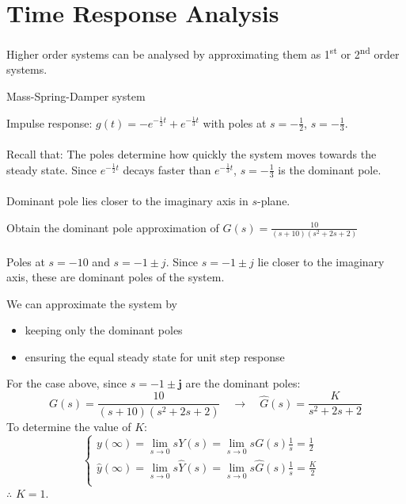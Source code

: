 \newpage
\section{Time Response Analysis}
Higher order systems can be analysed by approximating them as 1\textsuperscript{st} or 2\textsuperscript{nd} order systems. 
\begin{ex}{Mass-Spring-Damper system}
\begin{figure}[H] 
    \centering
    
\end{figure}
Impulse response: $g(t) = -e^{-\frac{1}{2}t}+ e^{-\frac{1}{3}t}$ with poles at $s=-\frac{1}{2}$, $s=-\frac{1}{3}$.\\\\
Recall that: The poles determine how quickly the system moves towards the steady state. Since $e^{-\frac{1}{2}t}$ decays faster than $e^{-\frac{1}{3}t}$, $s=-\frac{1}{3}$ is the dominant pole.\\\\
{\color{red}Dominant pole} lies closer to the imaginary axis in $s$-plane.
\begin{figure}[H] 
    \centering 
    
\end{figure}
\end{ex}
\begin{ex}{}
    Obtain the dominant pole approximation of $\displaystyle G(s) = \frac{10}{(s+10)(s^{2}+2s+2)}$\\\\
    Poles at $s=-10$ and $s = -1\pm j$. Since $s = -1\pm j$ lie closer to the imaginary axis, these are dominant poles of the system.
    \begin{figure}[H] 
        \centering 
        
    \end{figure}
    We can approximate the system by 
    \begin{itemize}
    \item keeping only the dominant poles
    \item ensuring the equal steady state for unit step response
    \end{itemize}
    For the case above, since $s = -1\pm \mathbf{j}$ are the dominant poles:
    \[ G(s) = \frac{10}{(s+10)(s^{2}+2s+2)} \quad \to \quad \hat{G}(s) =\frac{K}{s^{2}+2s+2}\]
    To determine the value of $K$:
    \[\begin{cases}
    \displaystyle
    y(\infty) = \lim_{s\to 0}sY(s) = \lim_{s\to0}sG(s)\frac{1}{s} = \frac{1}{2} \quad \\
    \displaystyle
    \hat{y}(\infty) = \lim_{s\to 0}s\hat{Y}(s) = \lim_{s\to0}s\hat{G}(s)\frac{1}{s} = \frac{K}{2}\\
    \end{cases}\]
    $\therefore$ \quad $K = 1$.
\end{ex}

